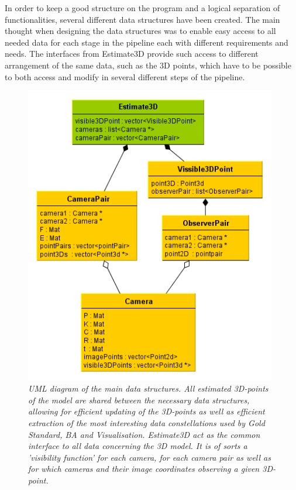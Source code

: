 In order to keep a good structure on the program and a logical separation of functionalities, several different data structures have been created. The main thought when designing the data structures was to enable easy access to all needed data for each stage in the pipeline each with different requirements and needs. The interfaces from Estimate3D provide such access to different arrangement of the same data, such as the 3D points, which have to be possible to both access and modify in several different steps of the pipeline.

\begin{figure}[htb]
	\centering
	\includegraphics[width=110mm]{images/data_structures_uml.png}
	\caption{\textit{UML diagram of the main data structures. All estimated 3D-points of the model are shared between the necessary data structures, allowing for efficient updating of the 3D-points as well as efficient extraction of the most interesting data constellations used by Gold Standard, BA and Visualisation. Estimate3D act as the common interface to all data concerning the 3D model. It is of sorts a 'visibility function' for each camera, for each camera pair as well as for which cameras and their image coordinates observing a given 3D-point.}}
	\label{fig:UML_fig} %
\end{figure}

